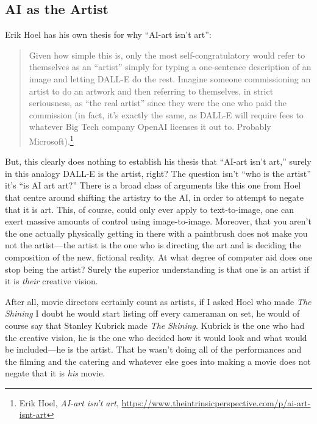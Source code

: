 \documentclass[11pt]{article}
\begin{document}
\subsection*{AI as the Artist}
\label{sec:orged4e6f8}
Erik Hoel has his own thesis for why ``AI-art isn't art'':
\begin{quote}
Given how simple this is, only the most self-congratulatory would refer to themselves as an “artist” simply for typing a one-sentence description of an image and letting DALL-E do the rest. Imagine someone commissioning an artist to do an artwork and then referring to themselves, in strict seriousness, as “the real artist” since they were the one who paid the commission (in fact, it’s exactly the same, as DALL-E will require fees to whatever Big Tech company OpenAI licenses it out to. Probably Microsoft).\footnote{Erik Hoel, \emph{AI-art isn't art}, \url{https://www.theintrinsicperspective.com/p/ai-art-isnt-art}}
\end{quote}

But, this clearly does nothing to establish his thesis that ``AI-art isn't art,'' surely in this analogy DALL-E is the artist, right? The question isn't ``who is the artist'' it's ``is AI art art?'' There is a broad class of arguments like this one from Hoel that centre around shifting the artistry to the AI, in order to attempt to negate that it is art. This, of course, could only ever apply to text-to-image, one can exert massive amounts of control using image-to-image. Moreover, that you aren't the one actually physically getting in there with a paintbrush does not make you not the artist---the artist is the one who is directing the art and is deciding the composition of the new, fictional reality. At what degree of computer aid does one stop being the artist? Surely the superior understanding is that one is an artist if it is \emph{their} creative vision.

After all, movie directors certainly count as artists, if I asked Hoel who made \emph{The Shining} I doubt he would start listing off every cameraman on set, he would of course say that Stanley Kubrick made \emph{The Shining}. Kubrick is the one who had the creative vision, he is the one who decided how it would look and what would be included---he is the artist. That he wasn't doing all of the performances and the filming and the catering and whatever else goes into making a movie does not negate that it is \emph{his} movie.
\end{document}
